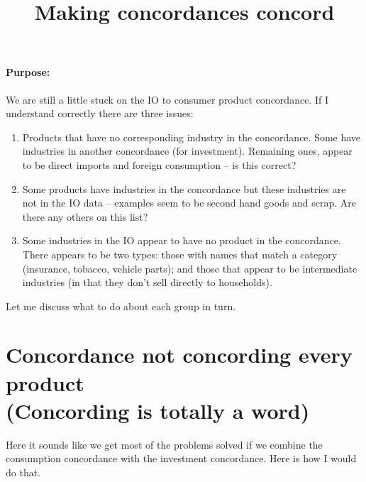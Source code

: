 \documentclass[12pt,english]{article}
\begin{document}


\title{Making concordances concord}
\maketitle

\paragraph{Purpose:} We are still a little stuck on the IO to consumer product concordance. If I understand correctly there are three issues:

\begin{enumerate}
	\item Products that have no corresponding industry in the concordance. Some have industries in another concordance (for investment). Remaining ones, appear to be direct imports and foreign consumption -- is this correct?
	\item Some products have industries in the concordance but these industries are not in the IO data -- examples seem to be second hand goods and scrap. Are there any others on this list?
	\item Some industries in the IO appear to have no product in the concordance. There appears to be two types: those with names that match a category (insurance, tobacco, vehicle parts); and those that appear to be intermediate industries (in that they don't sell directly to households).
\end{enumerate}

Let me discuss what to do about each group in turn.

\section{Concordance not concording every product\\ {\footnotesize (Concording is totally a word)}}
Here it sounds like we get most of the problems solved if we combine the consumption concordance with the investment concordance. Here is how I would do that.
\end{document}

